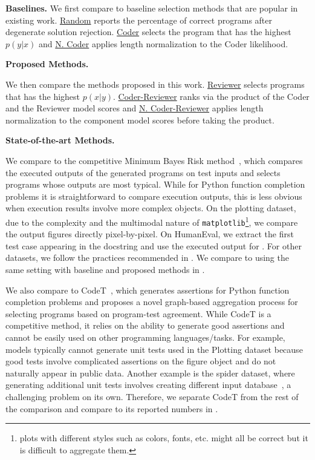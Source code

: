 \documentclass[nohyperref]{article}
\theoremstyle{plain}
\theoremstyle{definition}
\theoremstyle{remark}
\renewcommand{\paragraph}[1]{
     \textbf{#1} 
 }
\begin{document}
\paragraph{Baselines.} We first compare to baseline selection methods that are popular in existing work. \underline{Random} reports the percentage of correct programs after degenerate solution rejection.
\underline{Coder} selects the program that has the highest $p(y|x)$ and \underline{N. Coder} applies length normalization to the Coder likelihood.

\paragraph{Proposed Methods.}
We then compare the methods proposed in this work. \underline{Reviewer} selects programs that has the highest $p(x|y)$.
\underline{Coder-Reviewer} ranks via the product of the Coder and the Reviewer model scores and \underline{N. Coder-Reviewer} applies length normalization to the component model scores before taking the product.

\paragraph{State-of-the-art Methods.}
We compare to the competitive Minimum Bayes Risk method~\citep[\mbr{};][]{mbr}, which compares the executed outputs of the generated programs on test inputs and selects programs whose outputs are most typical.
While for Python function completion problems it is straightforward to compare execution outputs, this is less obvious when execution results involve more complex objects.
On the plotting dataset, due to the complexity and the multimodal nature of \texttt{matplotlib}\footnote{plots with different styles such as colors, fonts, etc. might all be correct but it is difficult to aggregate them.}, we compare the output figures directly pixel-by-pixel.
On HumanEval, we extract the first test case appearing in the docstring and use the executed output for \mbr{}.
For other datasets, we follow the practices recommended in \citet{mbr}.
We compare to \mbr{} using the same setting with baseline and proposed methods in .

We also compare to CodeT~\citep{codet}, which generates assertions for Python function completion problems and proposes a novel graph-based aggregation process for selecting programs based on program-test agreement.
While CodeT is a competitive method, it relies on the ability to generate good assertions and cannot be easily used on other programming languages/tasks.
For example, models typically cannot generate unit tests used in the Plotting dataset because good tests involve complicated assertions on the figure object and do not naturally appear in public data.
Another example is the spider dataset, where generating additional unit tests involves creating different input database~\citep{active-prior}, a challenging problem on its own.
Therefore, we separate CodeT from the rest of the comparison and compare to its reported numbers in .
\end{document}
